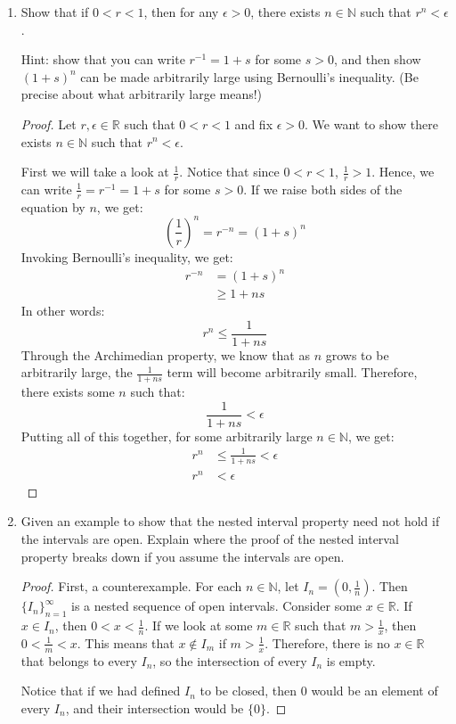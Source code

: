\documentclass[12pt]{amsart}
\begin{document}
\begin{enumerate}
\item Show that if $0<r<1$, then for any $\epsilon>0$, there exists $n\in \mathbb{N}$ such that $r^n<\epsilon$.  

Hint:  show that you can write $r^{-1}= 1+s$ for some $s>0$, and then show $(1+s)^n$ can be made arbitrarily large using Bernoulli's inequality.  (Be precise about what arbitrarily large means!)
\begin{proof}
Let $r,\epsilon\in\mathbb R$ such that $0<r<1$ and fix $\epsilon > 0$. We want to show there exists $n\in \mathbb{N}$ such that $r^n<\epsilon$.

First we will take a look at $\frac 1 r$. Notice that since $0<r<1$, $\frac 1 r > 1$. Hence, we can write $\frac 1 r = r^{-1} = 1+s$ for some $s>0$. If we raise both sides of the equation by $n$, we get:
\[ \left(\frac 1 r \right)^n = r^{-n} = (1+s)^n \]
Invoking Bernoulli's inequality, we get:
\begin{align*}
r^{-n} &= (1+s)^n \\
&\ge 1+ns
\end{align*}
In other words:
\[ 
r^n \le \frac 1 {1+ns}
\]
Through the Archimedian property, we know that as $n$ grows to be arbitrarily large, the $\frac 1 {1+ns}$ term will become arbitrarily small. Therefore, there exists some $n$ such that:
\[ \frac 1 {1+ns} < \epsilon \]
Putting all of this together, for some arbitrarily large $n\in\mathbb N$, we get:
\begin{align*}
r^n &\le \frac 1 {1+ns} < \epsilon \\
r^n &< \epsilon
\end{align*}
\end{proof}

\item Given an example to show that the nested interval property need
  not hold if the intervals are open.  Explain where  the proof of the
  nested interval property breaks down if you assume the intervals are open.
\begin{proof}
First, a counterexample. For each $n\in\mathbb N$, let $I_n = (0, \frac 1 n)$. Then $\{I_n\}_{n=1}^\infty$ is a nested sequence of open intervals. Consider some $x\in\mathbb R$. If $x\in I_n$, then $ 0 < x < \frac 1 n$. If we look at some $m\in\mathbb R$ such that $m > \frac 1 x$, then $0 < \frac 1 m < x$. This means that $x\not\in I_m$ if $m > \frac 1 x$. Therefore, there is no $x\in\mathbb R$ that belongs to every $I_n$, so the intersection of every $I_n$ is empty. 

Notice that if we had defined $I_n$ to be closed, then $0$ would be an element of every $I_n$, and their intersection would be $\{0\}$.


\end{proof}
\end{enumerate}
\end{document}
